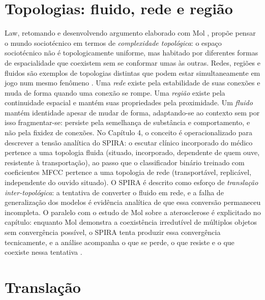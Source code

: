 \begin{description}
\bigskip

\section*{Topologias: fluido, rede e região}

Law, retomando e desenvolvendo argumento elaborado com Mol \parencite{MolLaw1994}, propõe pensar o mundo sociotécnico em termos de \textit{complexidade topológica}: o espaço sociotécnico não é topologicamente uniforme, mas habitado por diferentes formas de espacialidade que coexistem sem se conformar umas às outras. Redes, regiões e fluidos são exemplos de topologias distintas que podem estar simultaneamente em jogo num mesmo fenômeno \parencite{Law1999Actor}. Uma \textit{rede} existe pela estabilidade de suas conexões e muda de forma quando uma conexão se rompe. Uma \textit{região} existe pela continuidade espacial e mantém suas propriedades pela proximidade. Um \textit{fluido} mantém identidade apesar de mudar de forma, adaptando-se ao contexto sem por isso fragmentar-se: persiste pela semelhança de substância e comportamento, e não pela fixidez de conexões. No Capítulo 4, o conceito é operacionalizado para descrever a tensão analítica do SPIRA: o escutar clínico incorporado do médico pertence a uma topologia fluida (situado, incorporado, dependente de quem ouve, resistente à transportação), ao passo que o classificador binário treinado com coeficientes MFCC pertence a uma topologia de rede (transportável, replicável, independente do ouvido situado). O SPIRA é descrito como esforço de \textit{translação inter-topológica}: a tentativa de converter o fluido em rede, e a falha de generalização dos modelos é evidência analítica de que essa conversão permaneceu incompleta. O paralelo com o estudo de Mol sobre a aterosclerose é explicitado no capítulo: enquanto Mol demonstra a coexistência irredutível de múltiplos objetos sem convergência possível, o SPIRA tenta produzir essa convergência tecnicamente, e a análise acompanha o que se perde, o que resiste e o que coexiste nessa tentativa \parencite{MolLaw1994,Law1999Actor,Law2004After}.

\bigskip

\section*{Translação}


\end{description}
